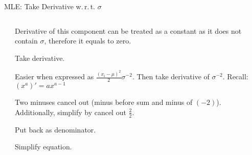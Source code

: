 \begin{frame}{MLE: Take Derivative w.\,r.\,t. $\sigma$}
\begin{columns}
\begin{column}{0.5\textwidth}
		\end{column}
		\begin{column}{0.5\textwidth}
			\begin{enumerate}
				{
				\item Derivative of this component can be treated as a constant as it does not contain $\sigma$, therefore it equals to zero.
				\item Take derivative.
				\item Easier when expressed as $\frac{(x_i-\mu)^2}{2}\sigma^{-2}$. Then take derivative of $\sigma^{-2}$. Recall: $(x^a)'=ax^{a-1}$
				\item Two minuses cancel out (minus before sum and minus of $(-2)$). Additionally, simplify by cancel out $\frac{2}{2}$.
				\item Put back as denominator.
				\item Simplify equation.
				      }
			\end{enumerate}
		\end{column}
	\end{columns}
\end{frame}

